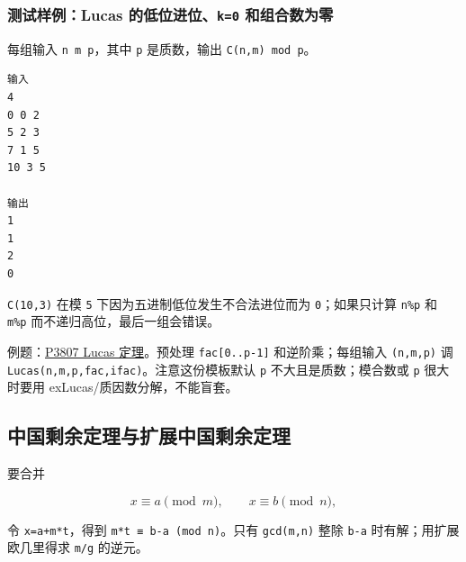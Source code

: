 \subsubsection{\texorpdfstring{测试样例：Lucas 的低位进位、\texttt{k=0} 和组合数为零}{测试样例：Lucas 的低位进位、k=0 和组合数为零}}

每组输入 \passthrough{\lstinline!n m p!}，其中 \passthrough{\lstinline!p!} 是质数，输出 \passthrough{\lstinline!C(n,m) mod p!}。

\begin{lstlisting}
输入
4
0 0 2
5 2 3
7 1 5
10 3 5

输出
1
1
2
0
\end{lstlisting}

\passthrough{\lstinline!C(10,3)!} 在模 \passthrough{\lstinline!5!} 下因为五进制低位发生不合法进位而为 \passthrough{\lstinline!0!}；如果只计算 \passthrough{\lstinline!n\%p!} 和 \passthrough{\lstinline!m\%p!} 而不递归高位，最后一组会错误。

例题：\href{https://www.luogu.com.cn/problem/P3807}{P3807 Lucas 定理}。预处理 \passthrough{\lstinline!fac[0..p-1]!} 和逆阶乘；每组输入 \passthrough{\lstinline!(n,m,p)!} 调 \passthrough{\lstinline!Lucas(n,m,p,fac,ifac)!}。注意这份模板默认 \passthrough{\lstinline!p!} 不大且是质数；模合数或 \passthrough{\lstinline!p!} 很大时要用 exLucas/质因数分解，不能盲套。


\subsection{中国剩余定理与扩展中国剩余定理}

要合并

\[x\equiv a\pmod m,\qquad x\equiv b\pmod n,\]

令 \passthrough{\lstinline!x=a+m*t!}，得到 \passthrough{\lstinline!m*t ≡ b-a (mod n)!}。只有 \passthrough{\lstinline!gcd(m,n)!} 整除 \passthrough{\lstinline!b-a!} 时有解；用扩展欧几里得求 \passthrough{\lstinline!m/g!} 的逆元。

